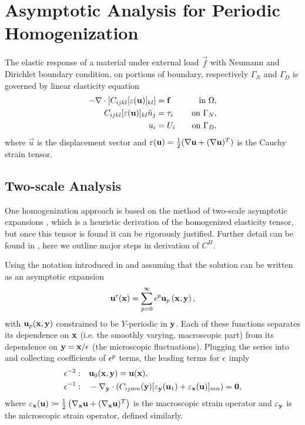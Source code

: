 \documentclass[twocolumn,10pt]{article}
\begin{document}
\section{Asymptotic Analysis for Periodic Homogenization\label{apx:asymptotic}}
The elastic response of a material under external load $\vec{f}$ with
Neumann and Dirichlet boundary condition, on portions of boundary,
respectively $\Gamma_N$ and $\Gamma_D$ is governed by linear
elasticity equation
\begin{subequations}
  \label{set:elastostatic}
  \begin{align}
    -\nabla \cdot [C_{ijkl} [\varepsilon(\mathbf u)]_{kl} ] &= \mathbf f \quad &\text{in } \Omega, \\
    C_{ijkl} [\varepsilon({\bf u})]_{kl}\hat{n}_j &= \tau_i \quad &\text{on } \Gamma_N, \\
    u_i &= U_i \quad &\text{on } \Gamma_D,
  \end{align}
\end{subequations}
where $\vec{u}$ is the displacement vector and
$\varepsilon(\mathbf u)=\frac{1}{2}(\nabla \mathbf u + (\nabla \mathbf u)^T)$ is
the Cauchy strain tensor.

\subsection{Two-scale Analysis}
One homogenization approach is based on the method of two-scale
asymptotic expansions \cite{allaire2002shape}, which is a heuristic
derivation of the homogenized elasticity tensor, but once this tensor
is found it can be rigorously justified. Further detail can be found
in \cite{allaire2002shape}, here we outline major steps in derivation
of $C^H$.

Using the notation introduced in  and assuming that
the solution can be written as an asymptotic expansion
\[
\mathbf u^\epsilon({\mathbf x}) = \sum_{p = 0}^{\infty} \epsilon^p \mathbf u_p\left(\mathbf x, \mathbf y\right),
\]
with ${\bf u}_p({\mathbf x}, {\mathbf y})$ constrained to be $Y$-periodic in ${\mathbf y}$.
Each of these functions separates its dependence on $\mathbf x$ (i.e. the
smoothly varying, macroscopic part) from its dependence on $\mathbf y =
\mathbf x/\epsilon$ (the microscopic fluctuations). Plugging the series into
 and collecting coefficients of $\epsilon^p$ terms, the
leading terms for $\epsilon$ imply
\begin{align}
  \epsilon^{-2}:\quad  & \mathbf u_0(\mathbf x,\mathbf y) = \mathbf u(\mathbf x), \label{eqn:em2}\\
  \epsilon^{-1}:\quad  & -\nabla_{\mathbf y} \cdot (C_{ijmn}(\mathbf y) [\varepsilon_{\mathbf y}(\mathbf u_1) + \varepsilon_{\mathbf x}(\mathbf u)]_{mn}) =  {\bf 0},  \label{eqn:em1}
\end{align}
where $\varepsilon_{\mathbf x}(\mathbf u) \coloneqq \frac{1}{2} \left( \nabla_{\mathbf x} \mathbf u
+ (\nabla_{\mathbf x} \mathbf u)^T \right)$ is the macroscopic strain operator
and $\varepsilon_{\mathbf y}$ is the microscopic strain operator, defined similarly.
\end{document}
